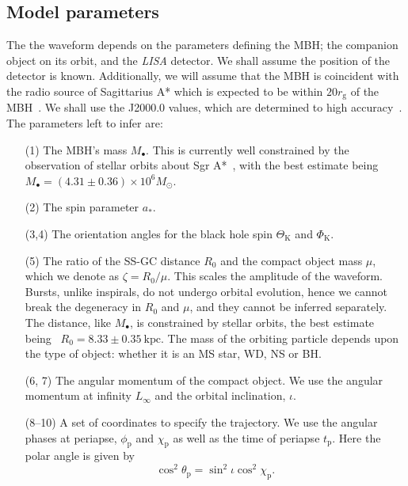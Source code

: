 \documentclass[11pt,twoside]{article}
\begin{document}
\subsection{Model parameters}

The the waveform depends on the parameters defining the MBH; the companion object on its orbit, and the \textit{LISA} detector. We shall assume the position of the detector is known. Additionally, we will assume that the MBH is coincident with the radio source of Sagittarius A*
which is expected to be within $20 r_\mathrm{g}$ of the MBH~\citep{Reid2003,Doeleman2008}. We shall use the J2000.0 values, which are determined to high accuracy~\citep{Reid1999, Yusef-Zadeh1999}. The parameters left to infer are:
\begin{enumerate}
\item[(1)] The MBH's mass $M_\bullet$. This is currently well constrained by the observation of stellar orbits about Sgr A*~\citep{Ghez2008, Gillessen2009}, with the best estimate being $M_\bullet = (4.31 \pm 0.36) \times 10^6 M_\odot$.
\item[(2)] The spin parameter $a_\ast$.
\item[(3,4)] The orientation angles for the black hole spin $\Theta_\mathrm{K}$ and $\Phi_\mathrm{K}$.
\item[(5)] The ratio of the SS-GC distance $R_0$ and the compact object mass $\mu$, which we denote as $\zeta = R_0/\mu$. This scales the amplitude of the waveform. Bursts, unlike inspirals, do not undergo orbital evolution, hence we cannot break the degeneracy in $R_0$ and $\mu$, and they cannot be inferred separately. The distance, like $M_\bullet$, is constrained by stellar orbits, the best estimate being~\citep{Gillessen2009} $R_0 = 8.33 \pm 0.35~\mathrm{kpc}$. The mass of the orbiting particle depends upon the type of object: whether it is an MS star, WD, NS or BH.
\item[(6, 7)] The angular momentum of the compact object. We use the angular momentum at infinity $L_\infty$ and the orbital inclination, $\iota$.
\item[(8--10)] A set of coordinates to specify the trajectory. We use the angular phases at periapse, $\phi_\mathrm{p}$ and $\chi_\mathrm{p}$ as well as the time of periapse $t_\mathrm{p}$. Here the polar angle is given by
\begin{equation}
\cos^2\theta_\mathrm{p} = \sin^2\iota\cos^2\chi_\mathrm{p}.
\end{equation}
\end{enumerate}
\end{document}
